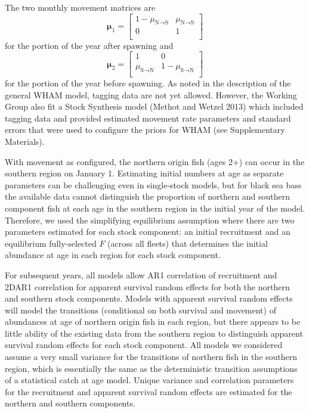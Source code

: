 \documentclass[
]{article}
\begin{document}
The two monthly movement matrices are
\begin{equation*}
\boldsymbol{\mu}_{1} = 
  \begin{bmatrix}
     1-\mu_{\text{N}\rightarrow \text{S}} & \mu_{\text{N}\rightarrow \text{S}} \\
     0 & 1 \\
  \end{bmatrix}
\end{equation*}
for the portion of the year after spawning and
\begin{equation*}
\boldsymbol{\mu}_{2} = 
  \begin{bmatrix}
     1 &  0 \\
     \mu_{\text{S}\rightarrow \text{N}} & 1-\mu_{\text{S}\rightarrow \text{N}} \\
  \end{bmatrix}
\end{equation*}
for the portion of the year before spawning. As noted in the description of the general WHAM model, tagging data are not yet allowed. However, the Working Group also fit a Stock Synthesis model (Methot and Wetzel 2013) which included tagging data and provided estimated movement rate parameters and standard errors that were used to configure the priors for WHAM (see Supplementary Materials).

With movement as configured, the northern origin fish (ages 2+) can occur in the southern region on January 1. Estimating initial numbers at age as separate parameters can be challenging even in single-stock models, but for black sea bass the available data cannot distinguish the proportion of northern and southern component fish at each age in the southern region in the initial year of the model. Therefore, we used the simplifying equilibrium assumption where there are two parameters estimated for each stock component: an initial recruitment and an equilibrium fully-selected \(F\) (across all fleets) that determines the initial abundance at age in each region for each stock component.

For subsequent years, all models allow AR1 correlation of recruitment and 2DAR1 correlation for apparent survival random effects for both the northern and southern stock components. Models with apparent survival random effects will model the transitions (conditional on both survival and movement) of abundances at age of northern origin fish in each region, but there appears to be little ability of the existing data from the southern region to distinguish apparent survival random effects for each stock component. All models we considered assume a very small variance for the transitions of northern fish in the southern region, which is essentially the same as the deterministic transition assumptions of a statistical catch at age model. Unique variance and correlation parameters for the recruitment and apparent survival random effects are estimated for the northern and southern components.
\end{document}
